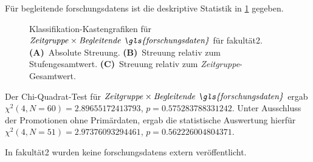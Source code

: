 Für begleitende \glspl{forschungsdaten} ist die deskriptive Statistik in \cref{fig:faculty_a_sampled_evaluated_adjusted_factors-only_Zeitgruppe_x_Begleitende.FD_absolute_boxplot} gegeben.
\begin{figure}[!htbp]
    \centering%
    \resizebox{.33\textwidth}{!}{}%
    \resizebox{.33\textwidth}{!}{}%
    \resizebox{.33\textwidth}{!}{}%
    \caption{Klassifikation-Kastengrafiken für $\text{\textit{Zeitgruppe}}\times\text{\textit{Begleitende \gls{forschungsdaten}}}$ für \gls{fakultät2}. \textbf{(A)}~Absolute Streuung. \textbf{(B)}~Streuung relativ zum Stufengesamtwert. \textbf{(C)}~Streuung relativ zum \textit{Zeitgruppe}-Gesamtwert.}
    \label{fig:faculty_a_sampled_evaluated_adjusted_factors-only_Zeitgruppe_x_Begleitende.FD_absolute_boxplot}
\end{figure} 
Der Chi-Quadrat-Test für $\text{\textit{Zeitgruppe}}\times\text{\textit{Begleitende \gls{forschungsdaten}}}$ ergab $\chi^2 (\num{4}, N = \num{60}) = \num[round-mode=places,round-precision=3]{2.89655172413793}$, $p = \num[round-mode=places,round-precision=3]{0.575283788331242}$.
Unter Ausschluss der Promotionen ohne Primärdaten, ergab die statistische Auswertung hierfür $\chi^2 (\num{4}, N = \num{51}) = \num[round-mode=places,round-precision=3]{2.97376093294461}$, $p = \num[round-mode=places,round-precision=3]{0.562226004804371}$.

In \gls{fakultät2} wurden keine \glspl{forschungsdaten} extern veröffentlicht.

